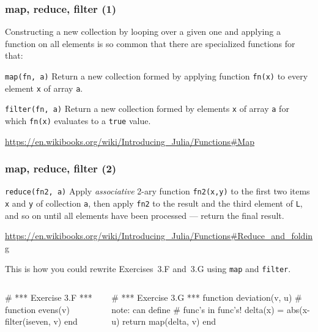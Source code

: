 \documentclass[english,serif,mathserif,xcolor=pdftex,dvipsnames,table]{beamer}
\begin{document}

\begin{frame}[fragile]
  \frametitle{map, reduce, filter (1)}

  Constructing a new collection by looping over a given one and applying a function
  on all elements is so common that there are specialized functions for that:

  \begin{describe}{\texttt{map(fn, a)}}
    Return a new collection formed by applying function \texttt{fn(x)}
    to every element \texttt{x} of array \texttt{a}.
  \end{describe}

  \+
  \begin{describe}{\texttt{filter(fn, a)}}
    Return a new collection formed by elements \texttt{x} of array
    \texttt{a} for which \texttt{fn(x)} evaluates to a \texttt{true} value.
  \end{describe}

  \+
  \begin{seealso}
    \url{https://en.wikibooks.org/wiki/Introducing_Julia/Functions#Map}
  \end{seealso}
\end{frame}


\begin{frame}[fragile]
  \frametitle{map, reduce, filter (2)}

  \begin{describe}{\texttt{reduce(fn2, a)}}
    Apply \emph{associative} 2-ary function \texttt{fn2(x,y)} to the
    first two items \texttt{x} and \texttt{y} of collection \texttt{a}, then
    apply \texttt{fn2} to the result and the third element of
    \texttt{L}, and so on until all elements have been processed ---
    return the final result.
  \end{describe}

  \+
  \begin{seealso}
    \url{https://en.wikibooks.org/wiki/Introducing_Julia/Functions#Reduce_and_folding}
  \end{seealso}
\end{frame}


\begin{frame}[fragile]
  This is how you could rewrite Exercises~3.F and~3.G using \texttt{map} and
  \texttt{filter}.

  \begin{columns}
    \begin{column}{0.5\linewidth}
\begin{jl}
# *** Exercise 3.F ***
function evens(v)
  filter(iseven, v)
end
\end{jl}
\end{column}
\begin{column}{0.5\linewidth}
\begin{jl}
# *** Exercise 3.G ***
function deviation(v, u)
  # note: can define
  # func's in func's!
  delta(x) = abs(x-u)
  return map(delta, v)
end
\end{jl}
\end{column}
\end{columns}
\end{frame}
\end{document}
